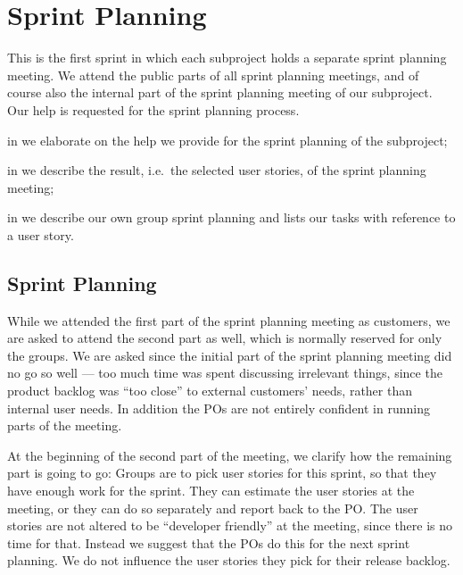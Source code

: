 \chapter{Sprint Planning}\label{chap:s2_sprintplanning}
This is the first sprint in which each subproject holds a separate sprint planning meeting. We attend the public parts of all sprint planning meetings, and of course also the internal part of the sprint planning meeting of our subproject. Our help is requested for the \db sprint planning process.

\begin{chapterorganization}
  \item in  we elaborate on the help we provide for the sprint planning of the \db subproject;
  \item in  we describe the result, i.e.\ the selected user stories, of the \bd sprint planning meeting;
  \item in  we describe our own group sprint planning and lists our tasks with reference to a user story.
\end{chapterorganization}


\section{\dbtitle Sprint Planning}\label{sec:S2_db}
While we attended the first part of the \db sprint planning meeting as customers, we are asked to attend the second part as well, which is normally reserved for only the \db groups. We are asked since the initial part of the sprint planning meeting did no go so well --- too much time was spent discussing irrelevant things, since the product backlog was ``too close'' to external customers' needs, rather than internal user needs. In addition the \db POs are not entirely confident in running parts of the meeting.

At the beginning of the second part of the meeting, we clarify how the remaining part is going to go: Groups are to pick user stories for this sprint, so that they have enough work for the sprint. They can estimate the user stories at the meeting, or they can do so separately and report back to the PO. The user stories are not altered to be ``developer friendly'' at the meeting, since there is no time for that. Instead we suggest that the POs do this for the next sprint planning. We do not influence the user stories they pick for their release backlog.


